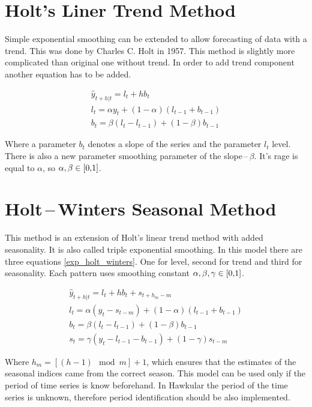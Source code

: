     \section{Holt's Liner Trend Method}
    Simple exponential smoothing can be extended to allow forecasting of data with a trend. 
    This was done by Charles C. Holt in 1957. This method is slightly more complicated than 
    original one without trend. In order to add trend component another equation has to be added. 

    \begin{eqnarray} \label{exp_holt}
        \hat{y}_{t+h|t} = l_{t} + hb_{t} \\ \nonumber
         l_t = \alpha y_t + (1 - \alpha) (l_{t-1} + b_{t-1}) \\ \nonumber
         b_t = \beta (l_t - l_{t-1}) + (1 - \beta)b_{t-1} 
    \end{eqnarray}

    Where a parameter $b_t$ denotes a slope of the series and the parameter $l_t$ level. 
    There is also a new parameter smoothing parameter of the slope\,--\,$\beta$. 
    It's rage is equal to $\alpha$, so $\alpha,\beta \in \interval[{0,1}]$. 

    \section{Holt\,--\,Winters Seasonal Method}
    This method is an extension of Holt's linear trend method with added
    seasonality. It is also called triple exponential smoothing. In this model 
    there are three equations \ref{exp_holt_winters}. 
    One for level, second for trend and third for seasonality.
    Each pattern uses smoothing constant $ \alpha,\beta,\gamma \in \interval[{0,1}]$.

    \begin{eqnarray} \label{exp_holt_winters}
        \hat{y}_{t+h|t} = l_{t} + hb_{t} + s_{t+h_m-m}\\ \nonumber
        l_t = \alpha (y_t - s_{t-m}) + (1 - \alpha) (l_{t-1} + b_{t-1}) \\ \nonumber
        b_t = \beta (l_t - l_{t-1}) + (1 - \beta)b_{t-1} \\ \nonumber
        s_t = \gamma (y_t - l_{t-1} - b_{t-1}) + (1-\gamma)s_{t-m}
    \end{eqnarray}

    Where $h_m=[(h-1) \mod m] + 1$, which ensures that the estimates of the seasonal
    indices came from the correct season. This model can be used only if the period 
    of time series is know beforehand. In Hawkular the period of the time series is 
    unknown, therefore period identification should be also implemented.
    
